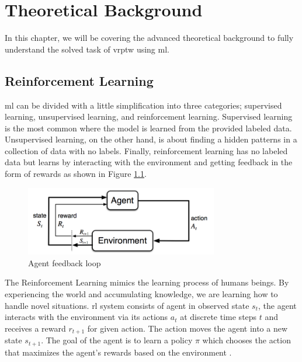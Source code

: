 \chapter{Theoretical Background}\label{theoretical_background}

In this chapter, we will be covering the advanced theoretical background to fully understand the solved task of \gls{vrptw} using \gls{ml}.

\section{Reinforcement Learning}\label{rl}
    \gls{ml} can be divided with a little simplification into three categories; supervised learning, unsupervised learning, and reinforcement learning. Supervised learning is the most common where the model is learned from the provided labeled data. Unsupervised learning, on the other hand, is about finding a hidden patterns in a collection of data with no labels. Finally, reinforcement learning has no labeled data but learns by interacting with the environment and getting feedback in the form of rewards as shown in Figure \ref{fig:rl-loop}. 
    
    \begin{figure}[ht]
        \centering
        \includegraphics[width=0.75\textwidth]{resources/theoretical-background/rl-loop.png}
        \caption{Agent feedback loop\cite{rl-intro}}
        \label{fig:rl-loop}
    \end{figure}
    
    The Reinforcement Learning mimics the learning process of humans beings. By experiencing the world and accumulating knowledge, we are learning how to handle novel situations. \gls{rl} system consists of agent in observed state $s_t$, the agent interacts with the environment via its actions $a_t$ at discrete time steps $t$ and receives a reward $r_{t+1}$ for given action. The action moves the agent into a new state $s_{t+1}$. The goal of the agent is to learn a policy $\pi$ which chooses the action that maximizes the agent's rewards based on the environment \cite{rl-intro}. 
    
